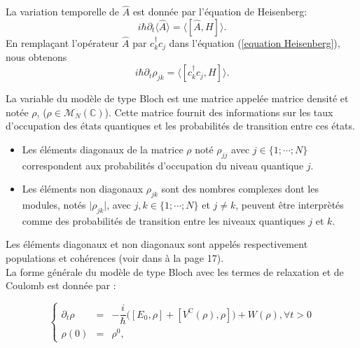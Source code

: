 \documentclass[12pt,a4paper,openany,oneside]{book}
\begin{document}
La variation temporelle de $ \hat{A}$ est donnée par l’équation de Heisenberg:
\begin{equation}\label{equation Heisenberg}
 i\hbar\partial_{t}\langle\hat{A}\rangle =\langle[\hat{A}, H]\rangle.
\end{equation}
En remplaçant l’opérateur $ \hat{A}$ par $ c_{k}^{\dagger}c_{j} $ dans l'équation (\ref{equation Heisenberg}), nous obtenons 
\begin{equation}
 i\hbar\partial_{t}\rho_{jk}=\langle[c_{k}^{\dagger}c_{j}, H]\rangle.
\end{equation}
\vspace{0.3cm}
\par
La variable du modèle de type Bloch est une matrice appelée matrice densité et notée $ \rho $, ($ \rho\in \mathcal{M}_{N}(\mathbb{C})$). 
Cette matrice fournit des informations sur les taux d'occupation des états quantiques et les probabilités de transition entre ces états. 
\begin{itemize}[label=$\bullet$] 
\item Les éléments diagonaux de la matrice $ \rho $ noté $ \rho_{jj} $ avec $ j\in\{1;\cdots;N\}$ correspondent aux probabilités d’occupation du niveau quantique $j$.
 \item Les éléments non diagonaux $ \rho_{jk}$ sont des nombres complexes dont les modules, notés $\vert\rho_{jk}\vert$, avec $ j,k \in\{1;\cdots;N\}$ et $ j\neq k $, peuvent être interprètés comme des probabilités de transition entre les niveaux quantiques $j$ et  $k$.
\end{itemize}
 Les éléments diagonaux et non diagonaux  sont appelés respectivement populations et cohérences (voir dans \cite{mareference1} à la page 17). \\
La forme générale du modèle de type Bloch avec les termes de relaxation et de Coulomb  est donnée par :

\begin{equation}\label{modèle de base}
\left\{
   \begin{array}{rcl}
   
   \partial_{t}\rho & = & -\dfrac{i}{\hbar}\Big([E_{0},\rho]+[V^{\textrm{C}}(\rho),\rho]\Big)+ W(\rho), \forall t>0 \\
   \rho(0)          & = & \rho^{0},
   
   \end{array}
 \right.
\end{equation}
\end{document}
